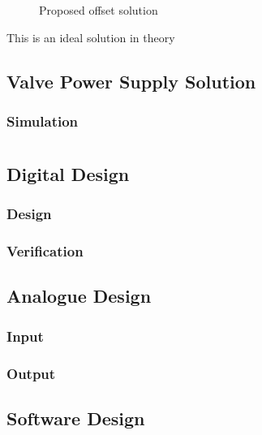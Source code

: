 \begin{figure}[ht]
	\centering
	\dummyfigure
	\caption{Proposed  offset solution}
	\label{fig:dc-offset}
\end{figure}

This is an ideal solution in theory 

\section{Valve Power Supply Solution} \label{sec:power-valve-supply}

\subsection{ Simulation}


\chapter{}

\section{Digital Design}

\subsection{ Design}

\subsection{ Verification}

\section{Analogue Design}

\subsection{Input}

\subsection{Output}

\section{Software Design}


